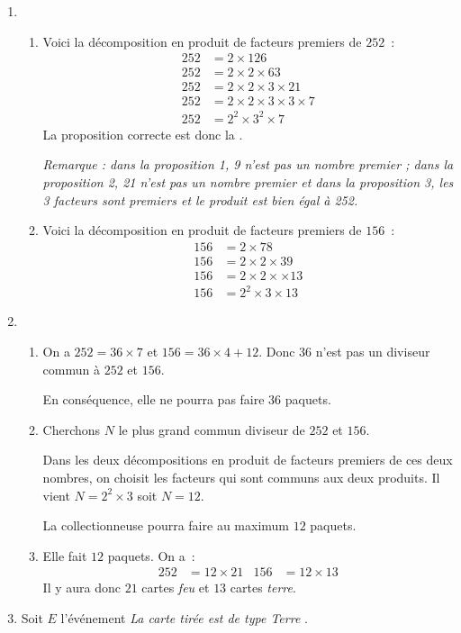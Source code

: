 
\medskip
\begin{enumerate}[itemsep=1em]
\item \begin{enumerate}[itemsep=1em]
  \item Voici la décomposition en produit de facteurs premiers de $252$~:
    \begin{align*}
      252 &= 2\times 126\\
      252 &= 2\times 2\times 63\\
      252 &= 2\times 2\times 3 \times 21\\
      252 &= 2\times 2\times 3 \times 3\times 7\\
      252 &= 2^2\times3^2\times 7
    \end{align*}
    La proposition correcte est donc la .
    
    \medskip
    \textit{Remarque : dans la proposition 1, 9 n'est pas un nombre premier ; dans la proposition 2, 21 n'est pas un nombre premier et dans la proposition 3, les 3 facteurs sont premiers et le produit est bien égal à 252. }
  \item Voici la décomposition en produit de facteurs premiers de $156$~:
    \begin{align*}
      156 &= 2 \times 78\\
      156 &= 2 \times 2 \times 39\\
      156 &= 2 \times 2 \times  \times 13\\
      156 &= 2^2 \times 3 \times 13
    \end{align*}
  \end{enumerate}
\item \begin{enumerate}[itemsep=1em]
  \item On a $252=36 \times 7$ et $156=36\times4+12$. Donc $36$ n'est pas un diviseur commun à $252$ et $156$.

    En conséquence, elle ne pourra pas faire $36$ paquets.
  \item Cherchons $N$ le plus grand commun diviseur de $252$ et $156$.

    Dans les deux décompositions en produit de facteurs premiers de ces deux nombres, on choisit les facteurs qui sont communs aux deux produits. Il vient $N=2^2\times3$ soit $N=12$.

    La collectionneuse pourra faire au maximum $12$ paquets.
  \item Elle fait $12$ paquets. On a~:
    \begin{align*}
      252 &= 12\times 21 & 156 &= 12\times13
    \end{align*}
    Il y aura donc $21$ cartes \textit{feu} et $13$ cartes \textit{terre}.
  \end{enumerate}
\item Soit $E$ l'événement \og \textit{La carte tirée est de type Terre} \fg.


\end{enumerate}

